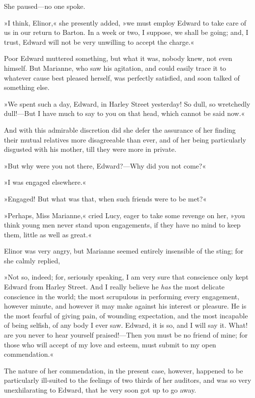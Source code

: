 She paused—no one spoke.

»I think, Elinor,« she presently added, »we must employ Edward to take care of us in our return to Barton. In a week or two, I suppose, we shall be going; and, I trust, Edward will not be very unwilling to accept the charge.«

Poor Edward muttered something, but what it was, nobody knew, not even himself. But Marianne, who saw his agitation, and could easily trace it to whatever cause best pleased herself, was perfectly satisfied, and soon talked of something else.

»We spent such a day, Edward, in Harley Street yesterday! So dull, so wretchedly dull!—But I have much to say to you on that head, which cannot be said now.«

And with this admirable discretion did she defer the assurance of her finding their mutual relatives more disagreeable than ever, and of her being particularly disgusted with his mother, till they were more in private.

»But why were you not there, Edward?—Why did you not come?«

»I was engaged elsewhere.«

»Engaged! But what was that, when such friends were to be met?«

»Perhaps, Miss Marianne,« cried Lucy, eager to take some revenge on her, »you think young men never stand upon engagements, if they have no mind to keep them, little as well as great.«

Elinor was very angry, but Marianne seemed entirely insensible of the sting; for she calmly replied,

»Not so, indeed; for, seriously speaking, I am very sure that conscience only kept Edward from Harley Street. And I really believe he \textit{has} the most delicate conscience in the world; the most scrupulous in performing every engagement, however minute, and however it may make against his interest or pleasure. He is the most fearful of giving pain, of wounding expectation, and the most incapable of being selfish, of any body I ever saw. Edward, it is so, and I will say it. What! are you never to hear yourself praised!—Then you must be no friend of mine; for those who will accept of my love and esteem, must submit to my open commendation.«

The nature of her commendation, in the present case, however, happened to be particularly ill-suited to the feelings of two thirds of her auditors, and was so very unexhilarating to Edward, that he very soon got up to go away.

